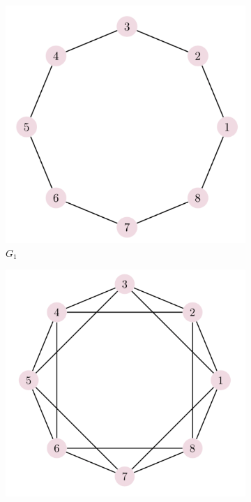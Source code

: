 \documentclass[../../dissertation.tex]{subfiles}
\begin{document}
\begin{figure}[!h]
  \centering
  \begin{subfigure}[t]{.23\textwidth}
    \centering
    \includegraphics[width=\linewidth]{img/Qiskit/ContQuantumWalk/Graphs/graph0.png}
    \caption{$G_1$}
  \end{subfigure}
  \begin{subfigure}[t]{.23\textwidth}
    \centering
    \includegraphics[width=\linewidth]{img/Qiskit/ContQuantumWalk/Graphs/graph1.png}

\end{subfigure}
\end{figure}
\end{document}
